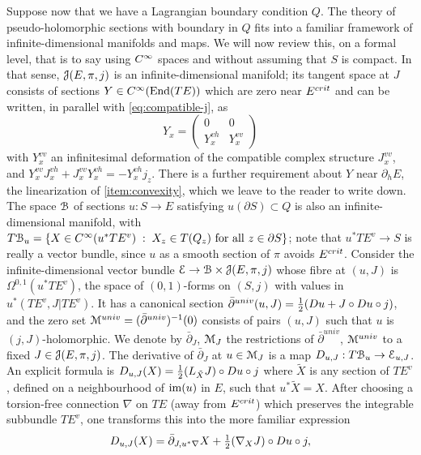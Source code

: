 \documentclass[10pt,letterpaper]{article}
\begin{document}
Suppose now that we have a Lagrangian boundary condition $Q$. The theory of
pseudo-holomorphic sections with boundary in $Q$ fits into a familiar framework
of infinite-dimensional manifolds and maps. We will now review this, on a
formal level, that is to say using $C^\infty$ spaces and without assuming that
$S$ is compact. In that sense, $\mathcal{J}(E,\pi,j)$ is an infinite-dimensional
manifold; its tangent space at $J$ consists of sections $Y \in
C^\infty(\mathrm{End}(TE))$ which are zero near $E^{crit}$ and can be written, in
parallel with \eqref{eq:compatible-j}, as
\begin{equation} \label{eq:tangent-compatible}
Y_x = \begin{pmatrix} 0 & 0 \\ Y^{vh}_x & Y^{vv}_x \end{pmatrix}
\end{equation}
with $Y^{vv}_x$ an infinitesimal deformation of the compatible complex
structure $J^{vv}_x$, and $Y^{vv}_xJ^{vh}_x + J^{vv}_x Y^{vh}_x = - Y^{vh}_x
j_z$. There is a further requirement about $Y$ near $\partial_hE$, the
linearization of \ref{item:convexity}, which we leave to the reader to write
down. The space $\mathcal{B}$ of sections $u: S \rightarrow E$ satisfying $u(\partial
S) \subset Q$ is also an infinite-dimensional manifold, with $T\mathcal{B}_u = \{ X \in
C^\infty(u^*TE^v) \; : \; X_z \in T(Q_z) \text{ for all } z \in \partial S\}$;
note that $u^*TE^v \rightarrow S$ is really a vector bundle, since $u$ as a
smooth section of $\pi$ avoids $E^{crit}$. Consider the infinite-dimensional
vector bundle $\mathcal{E} \rightarrow \mathcal{B} \times \mathcal{J}(E,\pi,j)$ whose fibre at $(u,J)$
is $\Omega^{0,1}(u^*TE^v)$, the space of $(0,1)$-forms on $(S,j)$ with values
in $u^*(TE^v,J|TE^v)$. It has a canonical section $\bar\partial^{univ}(u,J) =
{\textstyle\frac{1}{2}} (Du + J \circ Du \circ j)$, and the zero set $\mathcal{M}^{univ} =
(\bar\partial^{univ})^{-1}(0)$ consists of pairs $(u,J)$ such that $u$ is
$(j,J)$-holomorphic. We denote by $\bar\partial_J$, $\mathcal{M}_J$ the restrictions of
$\bar\partial^{univ}$, $\mathcal{M}^{univ}$ to a fixed $J \in \mathcal{J}(E,\pi,j)$. The
derivative of $\bar\partial_J$ at $u \in \mathcal{M}_J$ is a map $D_{u,J}: T\mathcal{B}_u
\rightarrow \mathcal{E}_{u,J}$. An explicit formula is
$
 D_{u,J}(X) = {\textstyle\frac{1}{2}} (L_{\tilde{X}}J) \circ Du \circ j
$
where $\tilde{X}$ is any section of $TE^v$, defined on a neighbourhood of
$\mathrm{im}(u)$ in $E$, such that $u^*\tilde{X} = X$. After choosing a torsion-free
connection $\nabla$ on $TE$ (away from $E^{crit}$) which preserves the
integrable subbundle $TE^v$, one transforms this into the more familiar
expression
\begin{equation} \label{eq:connection-formula}
 D_{u,J}(X) = \bar{\partial}_{J,u^*\nabla} X +
 {\textstyle\frac{1}{2}} (\nabla_X J) \circ Du \circ j,
\end{equation}
\end{document}
